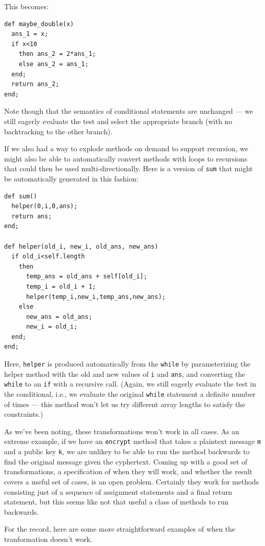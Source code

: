 \documentclass{article}
\newcounter{examples}
\begin{document}
This becomes:

\begin{verbatim}
def maybe_double(x)
  ans_1 = x;
  if x<10
    then ans_2 = 2*ans_1;
    else ans_2 = ans_1;
  end;
  return ans_2;
end;
\end{verbatim}

Note though that the semantics of conditional statements are unchanged
--- we still eagerly evaluate the test and select the appropriate
branch (with no backtracking to the other branch).

If we also had a way to explode methods on demand to support
recursion, we might also be able to automatically convert methods with
loops to recursions that could then be used multi-directionally.  Here
is a version of \verb|sum| that might be automatically generated in
this fashion:

\begin{verbatim}
def sum()
  helper(0,i,0,ans);
  return ans;
end;

def helper(old_i, new_i, old_ans, new_ans)
  if old_i<self.length
    then 
      temp_ans = old_ans + self[old_i];
      temp_i = old_i + 1;
      helper(temp_i,new_i,temp_ans,new_ans);
    else 
      new_ans = old_ans;
      new_i = old_i;
  end;
end;
\end{verbatim}

Here, \verb|helper| is produced automatically from the \verb|while| by
parameterizing the helper method with the old and new values of
\verb|i| and \verb|ans|, and converting the \verb|while| to an
\verb|if| with a recursive call.  (Again, we still eagerly evaluate
the test in the conditional, i.e., we evaluate the original
\verb|while| statement a definite number of times --- this method
won't let us try different array lengths to satisfy the constraints.)

As we've been noting, these transformations won't work in all cases.
As an extreme example, if we have an \verb|encrypt| method that takes
a plaintext message \verb|m| and a public key \verb|k|, we are unlikey
to be able to run the method backwards to find the original message
given the cyphertext.  Coming up with a good set of transformations, a
specification of when they will work, and whether the result covers a
useful set of cases, is an open problem.  Certainly they work for
methods consisting just of a sequence of assignment statements and a
final return statement, but this seems like not that useful a class of
methods to run backwards.

For the record, here are some more straightforward examples of when
the tranformation doesn't work.
\end{document}

